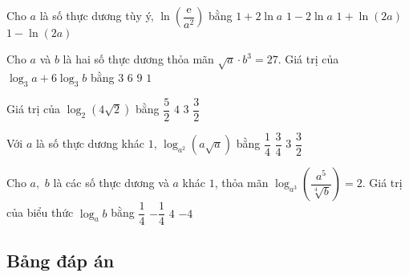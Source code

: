 \begin{ex}%
	Cho $a$ là số thực dương tùy ý, $\ln \left(\dfrac {\mathrm{e}}{a^2}\right)$ bằng
	\choice 
	{ $1+2\ln a$}
	{\True $1-2\ln a$}
	{ $1+\ln ( 2a )$}
	{ $1-\ln ( 2a )$}
\end{ex}



\begin{ex}%
	Cho $a$ và $b$ là hai số thực dương thỏa mãn $\sqrt{a}\cdot b^3=27$. Giá trị của $\log_{3} a+6\log_{3}b$ bằng
	\choice 
	{ $3$}
	{\True $6$}
	{ $9$}
	{ $1$}
\end{ex}



\begin{ex}%
	Giá trị của $\log_{2}( 4\sqrt{2} )$ bằng
	\choice 
	{\True $\dfrac{5}{2}$}
	{ $4$}
	{ $3$}
	{ $\dfrac{3}{2}$}
\end{ex}


\begin{ex}%
	Với $a$ là số thực dương khác $1$, $\log_{a^2}\left(a\sqrt{a}\right)$ bằng
	\choice 
	{ $\dfrac{1}{4}$}
	{ \True $\dfrac{3}{4}$}
	{ $3$}
	{ $\dfrac{3}{2}$}
\end{ex}


\begin{ex}%
	Cho $a,\,\,b$ là các số thực dương và $a$ khác $1$, thỏa mãn $\log_{a^3}\left(\dfrac{a^5}{\sqrt[4]{b}}\right)=2$. Giá trị của biểu thức ${{\log }_{a}}b$ bằng
	\choice 
	{ $\dfrac{1}{4}$}
	{ $-\dfrac{1}{4}$}
	{ $4$ }
	{\True $-4$}
\end{ex}

\subsection{Bảng đáp án}
